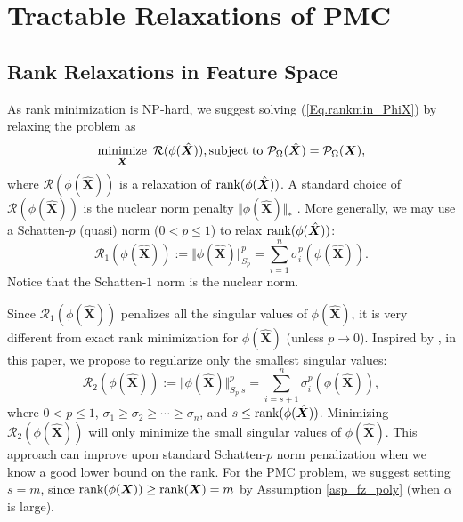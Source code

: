 \documentclass[letterpaper]{article} %
\begin{document}
\section{Tractable Relaxations of PMC}
\subsection{Rank Relaxations in Feature Space}
As rank minimization is NP-hard, we suggest solving (\ref{Eq.rankmin_PhiX}) by relaxing the problem as
\begin{equation}\label{Eq.rankmin_PhiX_relaxation}
\mathop{\text{minimize}}_{\hat{\bm{X}}}\ \mathcal{R}(\phi(\hat{\bm{X}})),
\textup{subject to}\ \mathcal{P}_{\Omega}(\hat{\bm{X}})=\mathcal{P}_{\Omega}(\bm{X}),
\end{equation}
where $\mathcal{R}(\phi(\hat{\bm{X}}))$ is a relaxation of $\textup{rank}(\phi(\hat{\bm{X}}))$.
A standard choice of $\mathcal{R}(\phi(\hat{\bm{X}}))$ is the nuclear norm penalty $\Vert \phi(\hat{\bm{X}})\Vert_\ast$ .
More generally,
we may use a Schatten-$p$ (quasi) norm ($0<p\leq 1$) \cite{Nie2015} to relax $\textup{rank}(\phi(\hat{\bm{X}}))$:
\begin{equation}
\mathcal{R}_1(\phi(\hat{\bm{X}})):=\Vert \phi(\hat{\bm{X}})\Vert_{S_p}^p=\sum_{i=1}^n\sigma_i^{p}(\phi(\hat{\bm{X}})).
\end{equation}
Notice that the Schatten-$1$ norm is the nuclear norm.


Since $\mathcal{R}_1(\phi(\hat{\bm{X}}))$ penalizes all the singular values of $\phi(\hat{\bm{X}})$, it is very different from exact rank minimization for $\phi(\hat{\bm{X}})$ (unless $p\rightarrow 0$). Inspired by \cite{MC_TNNR_PAMI2013,TIP_MC_TNNM}, in this paper, we propose to regularize only the smallest singular values:
\begin{equation}
\mathcal{R}_2(\phi(\hat{\bm{X}})):=\Vert \phi(\hat{\bm{X}})\Vert_{S_p\vert s}^p=\sum_{i=s+1}^n\sigma_i^{p}(\phi(\hat{\bm{X}})),
\end{equation}
where $0<p\leq 1$, $\sigma_1\geq\sigma_2\geq\cdots\geq\sigma_n$, and $s\leq \textup{rank}(\phi(\hat{\bm{X}}))$. Minimizing $\mathcal{R}_2(\phi(\hat{\bm{X}}))$ will only minimize the small singular values of $\phi(\hat{\bm{X}})$.
This approach can improve upon standard Schatten-$p$ norm penalization
when we know a good lower bound on the rank.
For the PMC problem, 
we suggest setting $s=m$,
since $\textup{rank}(\phi(\bm{X}))\geq \textup{rank}(\bm{X})=m$ by Assumption \ref{asp_fz_poly} (when $\alpha$ is large).
\end{document}
